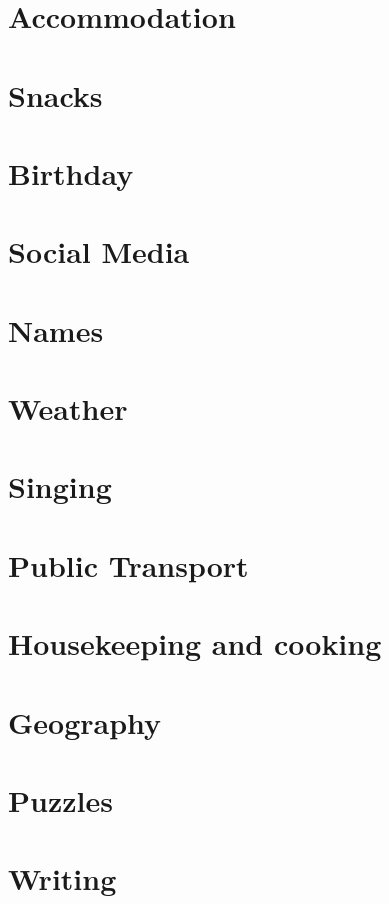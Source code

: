 \documentclass[conference]{IEEEtran}
\begin{document}
\section{Accommodation}

\section{Snacks}

\section{Birthday}

\section{Social Media}

\section{Names}

\section{Weather}

\section{Singing}

\section{Public Transport}

\section{Housekeeping and cooking}

\section{Geography}

\section{Puzzles}

\section{Writing}
\end{document}
